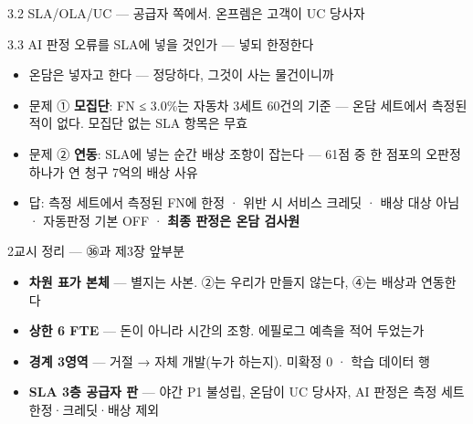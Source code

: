 \begin{frame}{3.2 SLA/OLA/UC — 공급자 쪽에서. 온프렘은 고객이 UC 당사자}
\end{frame}

\begin{frame}{3.3 AI 판정 오류를 SLA에 넣을 것인가 — 넣되 한정한다}
\begin{itemize}
\item 온담은 넣자고 한다 — 정당하다, 그것이 사는 물건이니까
\item 문제 ① \textbf{모집단}: FN ≤ 3.0\%는 자동차 3세트 60건의 기준 — 온담 세트에서 측정된 적이 없다. 모집단 없는 SLA 항목은 무효
\item 문제 ② \textbf{연동}: SLA에 넣는 순간 배상 조항이 잡는다 — 61점 중 한 점포의 오판정 하나가 연 청구 7억의 배상 사유
\item 답: 측정 세트에서 측정된 FN에 한정 · 위반 시 서비스 크레딧 · 배상 대상 아님 · 자동판정 기본 OFF · \textbf{최종 판정은 온담 검사원}
\end{itemize}
\end{frame}

\begin{frame}{2교시 정리 — ㊱과 제3장 앞부분}
\begin{itemize}
\item \textbf{차원 표가 본체} — 별지는 사본. ②는 우리가 만들지 않는다, ④는 배상과 연동한다
\item \textbf{상한 6 FTE} — 돈이 아니라 시간의 조항. 에필로그 예측을 적어 두었는가
\item \textbf{경계 3영역} — 거절 → 자체 개발(누가 하는지). 미확정 0 · 학습 데이터 행
\item \textbf{SLA 3층 공급자 판} — 야간 P1 불성립, 온담이 UC 당사자, AI 판정은 측정 세트 한정·크레딧·배상 제외
\end{itemize}
\end{frame}

